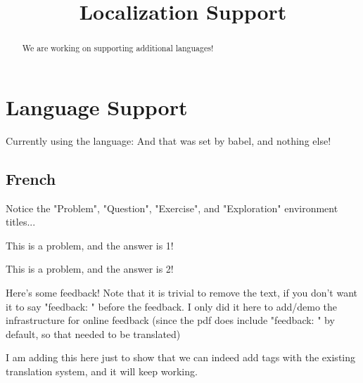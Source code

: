 \documentclass{ximera}
\title{Localization Support}
\begin{document}
\begin{abstract}%
    We are working on supporting additional languages!
\end{abstract}
\maketitle%
\section*{Language Support}%

Currently using the language: \languagename{} And that was set by babel, and nothing else!%


    \subsection*{French}%
    
        Notice the "Problem", "Question", "Exercise", and "Exploration" environment titles... 
        \begin{problem}%
            This is a problem, and the answer is 1! %
            \begin{multipleChoice}
            \end{multipleChoice}%
        \end{problem}
            
        \begin{question}
            This is a problem, and the answer is 2! %
            \begin{selectAll}
            \end{selectAll}%
            \begin{feedback}
                Here's some feedback! Note that it is trivial to remove the text, if you don't want it to say "feedback: " before the feedback. I only did it here to add/demo the infrastructure for online feedback (since the pdf does include "feedback: " by default, so that needed to be translated)%
            \end{feedback}
            \begin{feedback}[correct]
                I am adding this here just to show that we can indeed add tags with the existing translation system, and it will keep working.%
            \end{feedback}
        \end{question}
            
\end{document}
